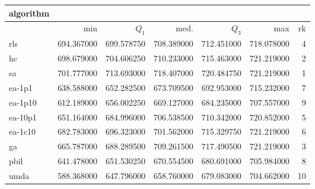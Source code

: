 \begin{tabular}{@{}l*{5}{>{{}}N{3}{2}}>{{}}N{2}{0}@{}}
\toprule
{algorithm} &  \\
\midrule
& {min} & {$Q_1$} & {med.} & {$Q_3$} & {max} & {rk}\\
\midrule
rls & 694.367000 & 699.578750 & 708.389000 & 712.451000 & 718.078000 & 4\\
hc & 698.679000 & 704.606250 & 710.233000 & 715.463000 & {\color{blue}} 721.219000 & 2\\
sa & {\color{blue}} 701.777000 & {\color{blue}} 713.693000 & {\color{blue}} 718.407000 & {\color{blue}} 720.484750 & {\color{blue}} 721.219000 & 1\\
ea-1p1 & 638.588000 & 652.282500 & 673.709500 & 692.953000 & 715.232000 & 7\\
ea-1p10 & 612.189000 & 656.002250 & 669.127000 & 684.235000 & 707.557000 & 9\\
ea-10p1 & 651.164000 & 684.996000 & 706.538500 & 710.342000 & 720.852000 & 5\\
ea-1c10 & 682.783000 & 696.323000 & 701.562000 & 715.329750 & {\color{blue}} 721.219000 & 6\\
ga & 665.787000 & 688.289500 & 709.261500 & 717.490500 & {\color{blue}} 721.219000 & 3\\
pbil & 641.478000 & 651.530250 & 670.554500 & 680.691000 & 705.984000 & 8\\
umda & 588.368000 & 647.796000 & 658.760000 & 679.083000 & 704.662000 & 10\\
\bottomrule
\end{tabular}
